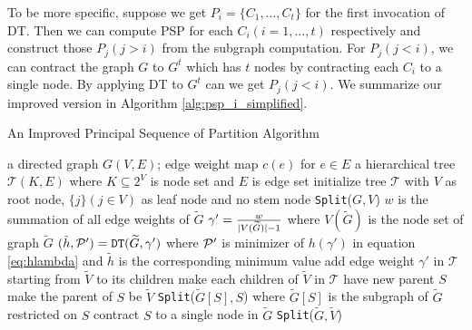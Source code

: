 \documentclass[runningheads]{llncs}
\begin{document}
To be more specific, suppose we get $P_i = \{C_1, \dots, C_t\}$ for the first invocation of DT. Then we can compute PSP for each $C_i(i=1,\dots, t)$ respectively and construct those $P_j(j>i)$ from the subgraph computation. For $P_j(j<i)$, we can contract the graph $G$  to $G^t$ which has $t$ nodes by contracting each $C_i$ to a single node. By applying DT to $G^t$ can we get $P_j(j<i)$. We summarize our improved version in Algorithm \ref{alg:psp_i_simplified}.

\begin{algorithm}
	\caption{An Improved Principal Sequence of Partition Algorithm}\label{alg:psp_i_simplified}
	\begin{algorithmic}[1]
		\REQUIRE a directed graph $G(V, E)$; edge weight map $c(e)$ for $e\in E$
		\ENSURE a hierarchical tree $\mathcal{T}(K, E)$ where $K \subseteq 2^{V}$ is node set and $E$ is edge set
		\STATE initialize tree $\mathcal{T}$ with $V$ as root node, $\{j\}(j \in V)$ as leaf node and no stem node
		\STATE \texttt{Split}($G, V$)
		\STATE $w$ is the summation of all edge weights of $\widetilde{G}$ 
		\STATE $\gamma' = \frac{w}{\abs{V(\widetilde{G})}-1}$ where $V(\widetilde{G})$ is the node set of graph $\widetilde{G}$ \label{alg:gamma_apostrophe}
		\STATE $(\tilde{h}, \P') = \texttt{DT}(\widetilde{G}, \gamma')$ where $\P'$ is minimizer of $h(\gamma')$ in equation \eqref{eq:hlambda} and $\tilde{h}$ is the corresponding minimum value  \label{alg:DT}
		\STATE add edge weight $\gamma'$ in $\mathcal{T}$ starting from $\widetilde{V}$ to its children
		\ELSE
		\STATE make each children of $\widetilde{V}$ in $\mathcal{T}$ have new parent $S$		
		\STATE make the parent of $S$ be $\widetilde{V}$
		\STATE \texttt{Split}($\widetilde{G}[S], S$) where $\widetilde{G}[S]$ is the subgraph of $\widetilde{G}$ restricted on $S$
		\STATE contract $S$ to a single node in $\widetilde{G}$ %
		\ENDFOR 
		\STATE \texttt{Split}($\widetilde{G}, \widetilde{V}$)		
		\ENDIF
		\ENDFUNCTION
	\end{algorithmic}
\end{algorithm}
	
	
	
\end{document}
